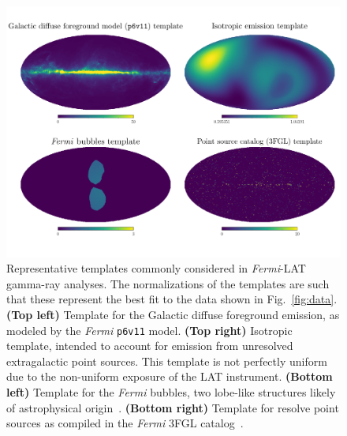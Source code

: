 \begin{figure}[htbp] 
\centering
 \includegraphics[width=1.0\textwidth]{ch-intro/templates.pdf}
\caption{Representative templates commonly considered in \emph{Fermi}-LAT gamma-ray analyses. The normalizations of the templates are such that these represent the best fit to the data shown in Fig.~\ref{fig:data}. \textbf{(Top left)} Template for the Galactic diffuse foreground emission, as modeled by the  {\it Fermi} \texttt{p6v11} model. \textbf{(Top right)} Isotropic template, intended to account for emission from unresolved extragalactic point sources. This template is not perfectly uniform due to the non-uniform exposure of the LAT instrument. \textbf{(Bottom left)} Template for the \emph{Fermi} bubbles, two lobe-like structures likely of astrophysical origin~\cite{Su:2010qj,Fermi-LAT:2014sfa}. \textbf{(Bottom right)} Template for resolve point sources as compiled in the \emph{Fermi} 3FGL catalog~\cite{Acero:2015hja}.}  
\label{fig:templates}
\end{figure}


